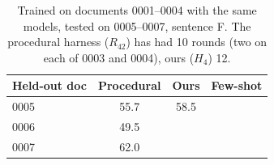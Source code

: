 \begin{table}[t]
\centering\small
\setlength{\tabcolsep}{3.5pt}
\begin{tabular}{@{}lccc@{}}
\toprule
Held-out doc & Procedural & Ours & Few-shot \\
\midrule
0005 & 55.7 & 58.5 & \gapcell{} \\
0006 & 49.5 & \gapcell{} & \gapcell{} \\
0007 & 62.0 & \gapcell{} & \gapcell{} \\
\bottomrule
\end{tabular}
\caption{Trained on documents 0001--0004 with the same models, tested on 0005--0007, sentence F. The procedural harness ($R_{42}$) has had 10 rounds (two on each of 0003 and 0004), ours ($H_4$) 12.}
\label{tab:matched}
\end{table}
